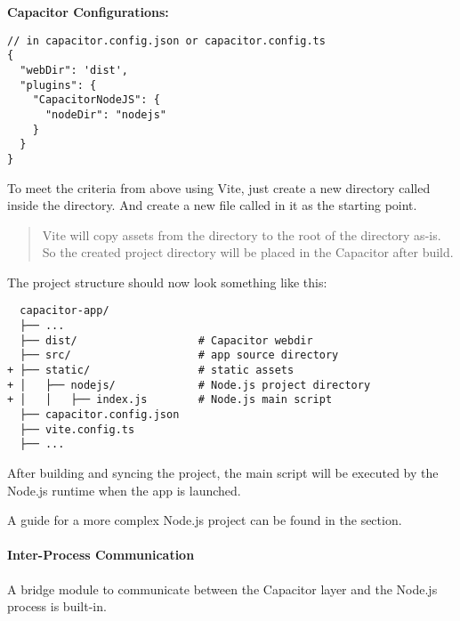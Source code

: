 \textbf{Capacitor Configurations:}

\begin{verbatim}
// in capacitor.config.json or capacitor.config.ts
{
  "webDir": 'dist',
  "plugins": {
    "CapacitorNodeJS": {
      "nodeDir": "nodejs"
    }
  }
}
\end{verbatim}

\vspace{1em}

To meet the criteria from above using Vite, just create a new directory called  inside the  directory.
And create a new file called  in it as the starting point.

\begin{quote}
  Vite will copy assets from the  directory to the root of the  directory as-is.~\cite{vite}
  So the created  project directory will be placed in the Capacitor  after build.
\end{quote}

\vspace{1em}

The project structure should now look something like this:

\begin{verbatim}
  capacitor-app/
  ├── ...
  ├── dist/                   # Capacitor webdir
  ├── src/                    # app source directory
+ ├── static/                 # static assets
+ │   ├── nodejs/             # Node.js project directory
+ │   │   ├── index.js        # Node.js main script
  ├── capacitor.config.json
  ├── vite.config.ts
  ├── ...
\end{verbatim}

\vspace{1em}

After building and syncing the project, the main script will be executed by the Node.js runtime when the app is launched.

A guide for a more complex Node.js project can be found in the  section.

\paragraph{Inter-Process Communication}
\label{sec:Capacitor-NodeJS:InterprocessCommunication}

A bridge module to communicate between the Capacitor layer and the Node.js process is built-in.

